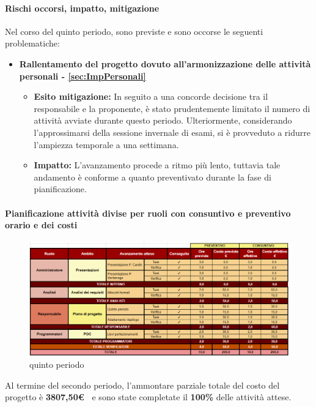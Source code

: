 \paragraph{Rischi occorsi, impatto, mitigazione} 
Nel corso del quinto periodo, sono previste e sono occorse le seguenti problematiche:
\begin{itemize}
    \item \textbf{Rallentamento del progetto dovuto all’armonizzazione delle attività personali - \ref{sec:ImpPersonali}}
    \begin{itemize}
        \item \textbf{Esito mitigazione:} 
        In seguito a una concorde decisione tra il responsabile e la proponente, è stato prudentemente limitato il numero di attività avviate durante questo periodo. Ulteriormente, considerando l'approssimarsi della sessione invernale di esami, si è provveduto a ridurre l'ampiezza temporale a una settimana.
        \item \textbf{Impatto:}
        L'avanzamento procede a ritmo più lento, tuttavia tale andamento è conforme a quanto preventivato durante la fase di pianificazione.
    \end{itemize}
\end{itemize}
\newpage
\paragraph{Pianificazione attività divise per ruoli con consuntivo e preventivo orario e dei costi}\hspace{1pt}

\begin{figure}[H]
    \centering
    \includegraphics[width=\linewidth, height=0.9\textheight, keepaspectratio]{../Images/periodo5.PNG}
    \caption{quinto periodo}
    \label{fig:Quarto_periodo}
\end{figure}

Al termine del secondo periodo, l'ammontare parziale totale del costo del progetto è \textbf{ 3807,50\euro\ } e sono state completate il \textbf{100\%} delle attività attese.


